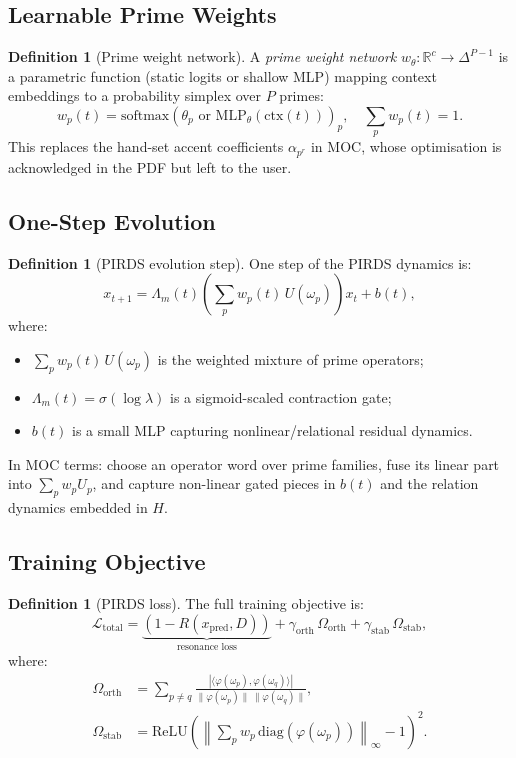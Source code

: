 \documentclass[11pt,a4paper]{article}
\theoremstyle{plain}
\theoremstyle{definition}
\newtheorem{definition}[theorem]{Definition}
\theoremstyle{remark}
\newcommand{\Loss}{\mathcal{L}}
\begin{document}
\subsection{Learnable Prime Weights}

\begin{definition}[Prime weight network]
  A \emph{prime weight network} $w_\theta : \mathbb{R}^c \to \Delta^{P-1}$ is a
  parametric function (static logits or shallow MLP) mapping context embeddings to
  a probability simplex over $P$ primes:
  \[
    w_p(t) = \mathrm{softmax}(\theta_p \text{ or } \mathrm{MLP}_\theta(\text{ctx}(t)))_p,
    \quad \sum_p w_p(t) = 1.
  \]
  This replaces the hand-set accent coefficients $\alpha_{p^r}$ in MOC, whose
  optimisation is acknowledged in the PDF but left to the user.
\end{definition}

\subsection{One-Step Evolution}

\begin{definition}[PIRDS evolution step]
  One step of the PIRDS dynamics is:
  \[
    x_{t+1} = \Lambda_m(t) \!\left(\sum_p w_p(t)\, U(\omega_p)\right) x_t + b(t),
  \]
  where:
  \begin{itemize}[itemsep=2pt]
    \item $\sum_p w_p(t)\, U(\omega_p)$ is the weighted mixture of prime operators;
    \item $\Lambda_m(t) = \sigma(\log\lambda)$ is a sigmoid-scaled contraction gate;
    \item $b(t)$ is a small MLP capturing nonlinear/relational residual dynamics.
  \end{itemize}
\end{definition}

In MOC terms: choose an operator word over prime families, fuse its linear part into
$\sum_p w_p U_p$, and capture non-linear gated pieces in $b(t)$ and the relation
dynamics embedded in $H$.

\subsection{Training Objective}

\begin{definition}[PIRDS loss]
  The full training objective is:
  \[
    \Loss_{\mathrm{total}} = \underbrace{(1 - R(x_{\mathrm{pred}}, D))}_{\text{resonance loss}}
    + \gamma_{\mathrm{orth}}\, \Omega_\mathrm{orth}
    + \gamma_{\mathrm{stab}}\, \Omega_\mathrm{stab},
  \]
  where:
  \begin{align}
    \Omega_\mathrm{orth} &= \sum_{p \neq q}
      \frac{|\langle \varphi(\omega_p), \varphi(\omega_q)\rangle|}
           {\|\varphi(\omega_p)\|\,\|\varphi(\omega_q)\|}, \\[4pt]
    \Omega_\mathrm{stab} &= \mathrm{ReLU}\!\left(
      \left\|\sum_p w_p\, \mathrm{diag}(\varphi(\omega_p))\right\|_\infty - 1
    \right)^2.
  \end{align}
\end{definition}
\end{document}
